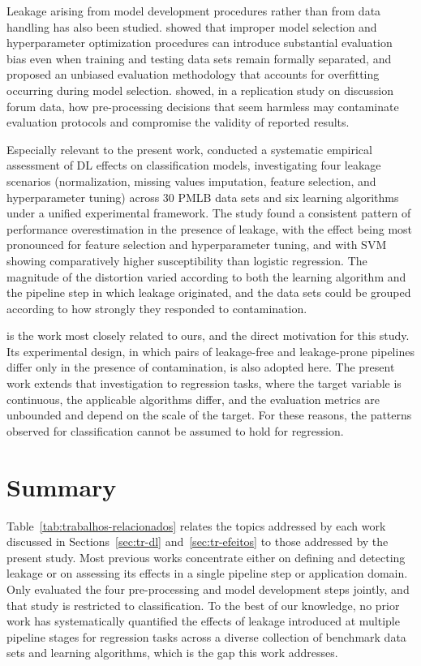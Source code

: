 Leakage arising from model development procedures rather than from data handling
has also been studied.  showed that improper model
selection and hyperparameter optimization procedures can introduce substantial
evaluation bias even when training and testing data sets remain formally
separated, and proposed an unbiased evaluation methodology that accounts for
overfitting occurring during model selection. 
showed, in a replication study on discussion forum data, how pre-processing
decisions that seem harmless may contaminate evaluation protocols and
compromise the validity of reported results.

Especially relevant to the present work,  conducted a
systematic empirical assessment of DL effects on classification models,
investigating four leakage scenarios (normalization, missing values
imputation, feature selection, and hyperparameter tuning) across 30 PMLB data
sets and six learning algorithms under a unified experimental framework. The
study found a consistent pattern of performance overestimation in the presence
of leakage, with the effect being most pronounced for feature selection and
hyperparameter tuning, and with SVM showing comparatively higher susceptibility
than logistic regression. The magnitude of the distortion varied according to
both the learning algorithm and the pipeline step in which leakage originated,
and the data sets could be grouped according to how strongly they responded to
contamination.

 is the work most closely related to ours, and the direct
motivation for this study. Its experimental design, in which pairs of leakage-free and
leakage-prone pipelines differ only in the presence of contamination, is
also adopted here. The present work extends that investigation to regression
tasks, where the target variable is continuous, the applicable algorithms differ,
and the evaluation metrics are unbounded and depend on the scale of the target.
For these reasons, the patterns observed for classification cannot be assumed to
hold for regression.

\section{Summary}
\label{sec:tr-sumario}

Table~\ref{tab:trabalhos-relacionados} relates the topics addressed by each work
discussed in Sections~\ref{sec:tr-dl} and~\ref{sec:tr-efeitos} to those addressed
by the present study. Most previous works concentrate either
on defining and detecting leakage or on assessing its effects in a single
pipeline step or application domain. Only  evaluated the
four pre-processing and model development steps jointly, and that study is
restricted to classification. To the best of our knowledge, no prior work has
systematically quantified the effects of leakage introduced at multiple pipeline
stages for regression tasks across a diverse collection of benchmark data sets
and learning algorithms, which is the gap this work addresses.

